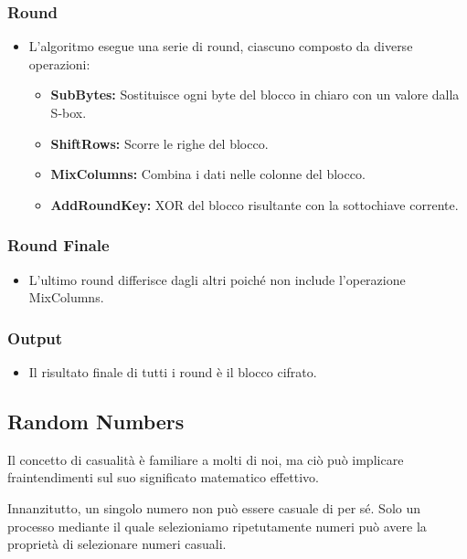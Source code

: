 \documentclass[11pt]{article}
\theoremstyle{definition} \newtheorem{definizione}{Definizione}[section] %
\begin{document}
        \subsubsection*{Round}
        \begin{itemize}
        \item L'algoritmo esegue una serie di round, ciascuno composto da diverse operazioni:
            \begin{itemize}
            \item \textbf{SubBytes:} Sostituisce ogni byte del blocco in chiaro con un valore dalla S-box.
            \item \textbf{ShiftRows:} Scorre le righe del blocco.
            \item \textbf{MixColumns:} Combina i dati nelle colonne del blocco.
            \item \textbf{AddRoundKey:} XOR del blocco risultante con la sottochiave corrente.
            \end{itemize}
        \end{itemize}

        \subsubsection*{Round Finale}
        \begin{itemize}
        \item L'ultimo round differisce dagli altri poiché non include l'operazione MixColumns.
        \end{itemize}

        \subsubsection*{Output}
        \begin{itemize}
        \item Il risultato finale di tutti i round è il blocco cifrato.
        \end{itemize}

    \subsection{Random Numbers}
    Il concetto di casualità è familiare a molti di noi, ma ciò può implicare fraintendimenti sul suo significato matematico effettivo.

    Innanzitutto, un singolo numero non può essere casuale di per sé. Solo un processo mediante il quale selezioniamo ripetutamente numeri può avere la proprietà di selezionare numeri casuali.
\end{document}
